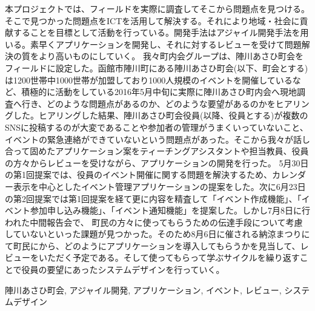 \begin{jabstract}
\quad 本プロジェクトでは、フィールドを実際に調査してそこから問題点を見つける。そこで見つかった問題点をICTを活用して解決する。それにより地域・社会に貢献することを目標として活動を行っている。開発手法はアジャイル開発手法を用いる。素早くアプリケーションを開発し、それに対するレビューを受けて問題解決の質をより高いものにしていく。
我々町内会グループは、陣川あさひ町会をフィールドに設定した。函館市陣川町にある陣川あさひ町会(以下、町会とする)は1200世帯中1000世帯が加盟しており1000人規模のイベントを開催しているなど、積極的に活動をしている2016年5月中旬に実際に陣川あさひ町内会へ現地調査へ行き、どのような問題点があるのか、どのような要望があるのかをヒアリングした。ヒアリングした結果、陣川あさひ町会役員(以降、役員とする)が複数のSNSに投稿するのが大変であることや参加者の管理がうまくいっていないこと、イベントの緊急連絡ができていないという問題点があった。そこから我々が話し合って固めたアプリケーション案をティーチングアシスタントや担当教員、役員の方々からレビューを受けながら、アプリケーションの開発を行った。
5月30日の第1回提案では、役員のイベント開催に関する問題を解決するため、カレンダー表示を中心としたイベント管理アプリケーションの提案をした。次に6月23日の第2回提案では第1回提案を経て更に内容を精査して「イベント作成機能」、「イベント参加申し込み機能」、「イベント通知機能」を提案した。しかし7月8日に行われた中間報告会で、
町民の方々に使ってもらうための伝達手段について考慮していないといった課題が見つかった。そのため8月6日に催される納涼まつりにて町民にから、どのようにアプリケーションを導入してもらうかを見当して、レビューをいただく予定である。そして使ってもらって学ぶサイクルを繰り返すことで役員の要望にあったシステムデザインを行っていく。

\begin{jkeyword}
陣川あさひ町会, アジャイル開発, アプリケーション, イベント, レビュー, システムデザイン
\end{jkeyword}
\end{jabstract}
​
